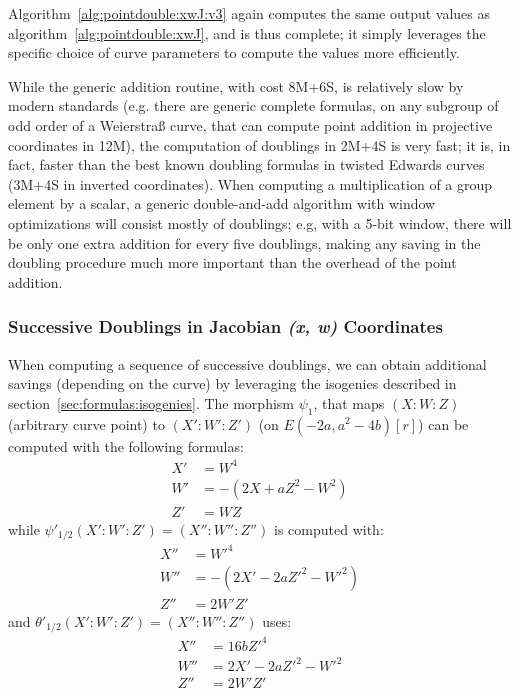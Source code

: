 \documentclass{llncs}
\begin{document}
Algorithm~\ref{alg:pointdouble:xwJ:v3} again computes the same output
values as algorithm~\ref{alg:pointdouble:xwJ}, and is thus complete; it
simply leverages the specific choice of curve parameters to compute the
values more efficiently.

While the generic addition routine, with cost 8M+6S, is relatively slow
by modern standards (e.g. there are generic complete formulas, on any
subgroup of odd order of a Weierstraß curve, that can compute point
addition in projective coordinates in 12M\cite{RenCosBat2015}), the
computation of doublings in 2M+4S is very fast; it is, in fact, faster
than the best known doubling formulas in twisted Edwards curves (3M+4S
in inverted coordinates\cite{BerBirJoyLanPet2008}). When computing a
multiplication of a group element by a scalar, a generic double-and-add
algorithm with window optimizations will consist mostly of doublings;
e.g, with a 5-bit window, there will be only one extra addition for
every five doublings, making any saving in the doubling procedure much
more important than the overhead of the point addition.

\subsubsection{Successive Doublings in Jacobian \emph{(x, w)} Coordinates}\label{sec:algorithms:xwJ:xdbl}

When computing a sequence of successive doublings, we can obtain
additional savings (depending on the curve) by leveraging the isogenies
described in section~\ref{sec:formulas:isogenies}. The morphism
$\psi_1$, that maps $(X{:}W{:}Z)$ (arbitrary curve point) to
$(X'{:}W'{:}Z')$ (on $E(-2a,a^2-4b)[r]$) can be computed with the
following formulas:
\begin{align*}
    X' &= W^4 \\
    W' &= -(2X + aZ^2 - W^2) \\
    Z' &= WZ
\end{align*}
while $\psi'_{1/2}(X'{:}W'{:}Z') = (X''{:}W''{:}Z'')$ is computed with:
\begin{align*}
    X'' &= W'^4 \\
    W'' &= -(2X' - 2aZ'^2 - W'^2) \\
    Z'' &= 2W'Z'
\end{align*}
and $\theta'_{1/2}(X'{:}W'{:}Z') = (X''{:}W''{:}Z'')$ uses:
\begin{align*}
    X'' &= 16bZ'^4 \\
    W'' &= 2X' - 2aZ'^2 - W'^2 \\
    Z'' &= 2W'Z'
\end{align*}
\end{document}
